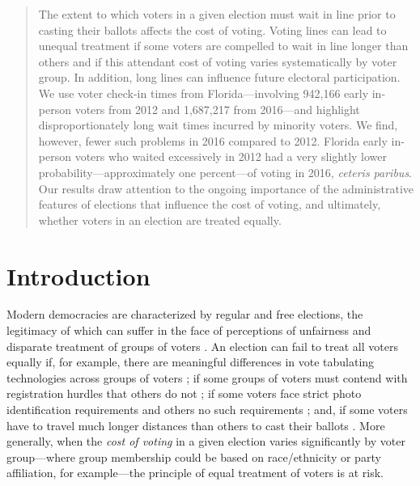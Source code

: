 \documentclass[12pt,titlepage]{article}
\begin{document}
\begin{abstract}
  \noindent 
  The extent to which voters in a given election must wait in line
  prior to casting their ballots \mbox{affects} the cost of voting. 
  Voting lines can lead to unequal treatment if some voters are compelled to wait in line
  longer than others and if this attendant cost of voting varies systematically by voter group. 
  In addition, long lines can influence future
  electoral participation.  We use voter check-in times from
  Florida---involving 942,166 early in-person voters from 2012 and
  1,687,217 from 2016---and highlight disproportionately long wait
  times incurred by minority voters.  We find, however, fewer such
  problems in 2016 compared to 2012.  Florida early in-person voters
  who waited excessively in 2012 had a very slightly lower
  probability---approximately one percent---of voting in 2016,
  \emph{ceteris paribus}.  Our results draw attention to the ongoing
  importance of the administrative features of elections that
  influence the cost of voting, and ultimately, whether voters in an
  election are treated equally.
\end{abstract}



\newpage
\section*{Introduction}

Modern democracies are characterized by regular and free elections,
the legitimacy of which can suffer in the face of perceptions of
unfairness and disparate treatment of groups of voters
\citep{norris2014electoral}.  An election can fail to treat all voters
equally if, for example, there are meaningful differences in vote
tabulating technologies across groups of voters
\citep[e.g.,][]{kimballkropf:tech}; if some groups of voters must
contend with registration hurdles that others do not
\cite[e.g.,][]{ansolhersh:registration}; if some voters face strict
photo identification requirements and others no such requirements
\citep[e.g.,][]{benteleetal:newjimcrow}; and, if some voters have to
travel much longer distances than others to cast their ballots
\citep[e.g.,][]{dyckgimpel:distance}.  More generally, when the
\emph{cost of voting} in a given election varies significantly by
voter group---where group membership could be based on race/ethnicity
or party affiliation, for example---the principle of equal treatment
of voters is at risk.
\end{document}
